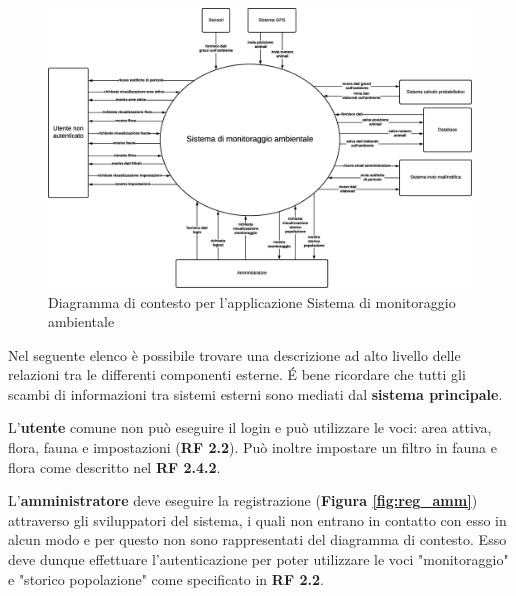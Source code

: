 \begin{figure}[ht]
    \centering
    \includegraphics[scale=0.3]{Img/DiagrammaDiContesto.eps}
    \caption{Diagramma di contesto per l'applicazione Sistema di monitoraggio ambientale}
\end{figure}
\vspace{5mm}

\noindent
Nel seguente elenco è possibile trovare una descrizione ad alto livello delle relazioni tra le differenti componenti esterne. \'E bene ricordare che tutti gli scambi di informazioni tra sistemi esterni sono mediati dal \textbf{sistema principale}.
\vspace{5mm}

\noindent
L'\textbf{utente} comune non può eseguire il login e può utilizzare le voci: area attiva, flora, fauna e impostazioni (\textbf{RF 2.2}). Può inoltre impostare un filtro in fauna e flora come descritto nel \textbf{RF 2.4.2}. 

\vspace{5mm}

\noindent
L'\textbf{amministratore} deve eseguire la registrazione (\textbf{Figura \ref{fig:reg_amm}}) attraverso gli sviluppatori del sistema, i quali non entrano in contatto con esso in alcun modo e per questo non sono rappresentati del diagramma di contesto. Esso deve dunque effettuare l'autenticazione per poter utilizzare le voci "monitoraggio" e "storico popolazione" come specificato in \textbf{RF 2.2}.


